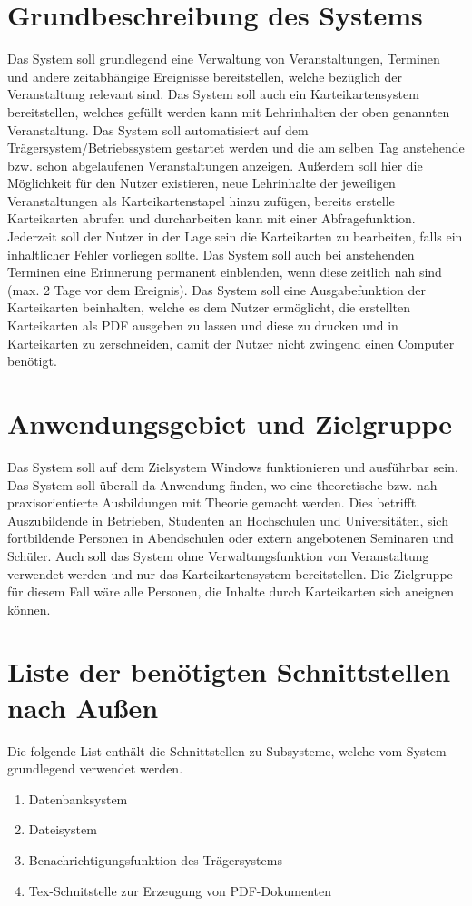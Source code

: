\documentclass[
a4paper,
twoside,
DIV=12,
BCOR=8mm,
headlineinclude=true,
footinclude=false,
numbers=noenddot,
headheight=40pt, 11pt]{scrartcl}
\begin{document}
\section{Grundbeschreibung des Systems}
Das System soll grundlegend eine Verwaltung von Veranstaltungen, Terminen und andere zeitabhängige Ereignisse bereitstellen, welche bezüglich der Veranstaltung relevant sind. Das System soll auch ein Karteikartensystem bereitstellen, welches gefüllt werden kann mit Lehrinhalten der oben genannten Veranstaltung. Das System soll automatisiert auf dem Trägersystem/Betriebssystem gestartet werden und die am selben Tag anstehende bzw. schon abgelaufenen Veranstaltungen anzeigen. Außerdem soll hier die Möglichkeit für den Nutzer existieren, neue Lehrinhalte der jeweiligen Veranstaltungen als Karteikartenstapel hinzu zufügen, bereits erstelle Karteikarten abrufen und durcharbeiten kann mit einer Abfragefunktion. Jederzeit soll der Nutzer in der Lage sein die Karteikarten zu bearbeiten, falls ein inhaltlicher Fehler vorliegen sollte. Das System soll auch bei anstehenden Terminen eine Erinnerung permanent einblenden, wenn diese zeitlich nah sind (max. 2 Tage vor dem Ereignis). Das System soll eine Ausgabefunktion der Karteikarten beinhalten, welche es dem Nutzer ermöglicht, die erstellten Karteikarten als PDF ausgeben zu lassen und diese zu drucken und in Karteikarten zu zerschneiden, damit der Nutzer nicht zwingend einen Computer benötigt.
\section{Anwendungsgebiet und Zielgruppe}
Das System soll auf dem Zielsystem Windows funktionieren und ausführbar sein.
Das System soll überall da Anwendung finden, wo eine theoretische bzw. nah praxisorientierte Ausbildungen mit Theorie gemacht werden. Dies betrifft Auszubildende in Betrieben, Studenten an Hochschulen und Universitäten, sich fortbildende Personen in Abendschulen oder extern angebotenen Seminaren und Schüler. Auch soll das System ohne Verwaltungsfunktion von Veranstaltung verwendet werden und nur das Karteikartensystem bereitstellen. Die Zielgruppe für diesem Fall wäre alle Personen, die Inhalte durch Karteikarten sich aneignen können. 
\section{Liste der benötigten Schnittstellen nach Außen}
Die folgende List enthält die Schnittstellen zu Subsysteme, welche vom System grundlegend verwendet werden.
\begin{enumerate}
	\item Datenbanksystem
	\item Dateisystem
	\item Benachrichtigungsfunktion des Trägersystems
	\item Tex-Schnitstelle zur Erzeugung von PDF-Dokumenten
\end{enumerate}
\end{document}
